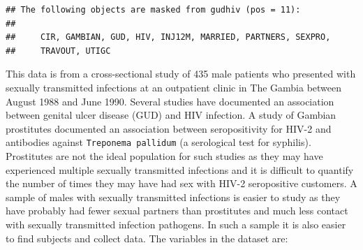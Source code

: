 \documentclass[12pt,a4paper]{book}
\theoremstyle{definition}
\theoremstyle{definition}
\theoremstyle{definition}
\theoremstyle{remark}
\begin{document}
\begin{verbatim}
## The following objects are masked from gudhiv (pos = 11):
## 
##     CIR, GAMBIAN, GUD, HIV, INJ12M, MARRIED, PARTNERS, SEXPRO,
##     TRAVOUT, UTIGC
\end{verbatim}

This data is from a cross-sectional study of 435 male patients who
presented with sexually transmitted infections at an outpatient clinic
in The Gambia between August 1988 and June 1990. Several studies have
documented an association between genital ulcer disease (GUD) and HIV
infection. A study of Gambian prostitutes documented an association
between seropositivity for HIV-2 and antibodies against
\texttt{Treponema\ pallidum} (a serological test for syphilis).
Prostitutes are not the ideal population for such studies as they may
have experienced multiple sexually transmitted infections and it is
difficult to quantify the number of times they may have had sex with
HIV-2 seropositive customers. A sample of males with sexually
transmitted infections is easier to study as they have probably had
fewer sexual partners than prostitutes and much less contact with
sexually transmitted infection pathogens. In such a sample it is also
easier to find subjects and collect data. The variables in the dataset
are:
\end{document}
